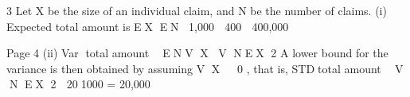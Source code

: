 \documentclass[a4paper,12pt]{article}
\begin{document}
3 Let X be the size of an individual claim, and N be the number of claims.
(i) Expected total amount is EX EN 1,000  400  400,000

Page 4
(ii) Var total amount  ENV X V NEX 2
A lower bound for the variance is then obtained by assuming V X   0 , that
is,
STDtotal amount  V N EX 2  201000 = 20,000
\end{document}
